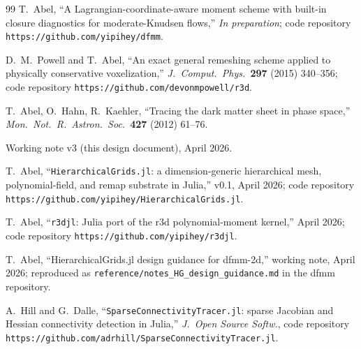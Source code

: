 \documentclass[11pt]{article}
\begin{document}

\begin{thebibliography}{99}
T.~Abel, ``A Lagrangian-coordinate-aware moment scheme with built-in
closure diagnostics for moderate-Knudsen flows,'' \emph{In preparation};
code repository \texttt{https://github.com/yipihey/dfmm}.

D.~M.~Powell and T.~Abel, ``An exact general remeshing scheme applied
to physically conservative voxelization,''
\emph{J.~Comput.~Phys.\ }\textbf{297} (2015) 340--356;
code repository \texttt{https://github.com/devonmpowell/r3d}.

T.~Abel, O.~Hahn, R.~Kaehler, ``Tracing the dark matter sheet in
phase space,'' \emph{Mon.~Not.~R.~Astron.~Soc.}\ \textbf{427} (2012) 61--76.

Working note v3 (this design document), April 2026.

T.~Abel, ``\texttt{HierarchicalGrids.jl}: a dimension-generic
hierarchical mesh, polynomial-field, and remap substrate in Julia,''
v0.1, April 2026; code repository
\texttt{https://github.com/yipihey/HierarchicalGrids.jl}.

T.~Abel, ``\texttt{r3djl}: Julia port of the r3d polynomial-moment
kernel,'' April 2026; code repository
\texttt{https://github.com/yipihey/r3djl}.

T.~Abel, ``HierarchicalGrids.jl design guidance for dfmm-2d,''
working note, April 2026; reproduced as
\texttt{reference/notes\_HG\_design\_guidance.md} in the dfmm
repository.

A.~Hill and G.~Dalle, ``\texttt{SparseConnectivityTracer.jl}:
sparse Jacobian and Hessian connectivity detection in Julia,''
\emph{J.~Open Source Softw.}, code repository
\texttt{https://github.com/adrhill/SparseConnectivityTracer.jl}.
\end{thebibliography}
\end{document}
